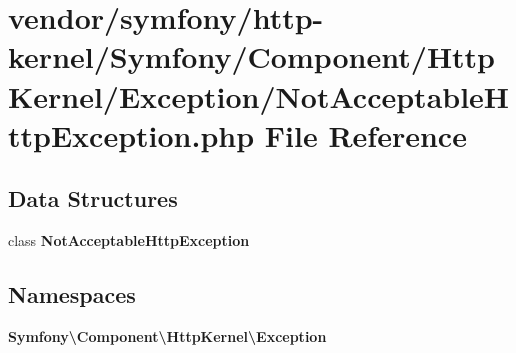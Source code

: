 \section{vendor/symfony/http-\/kernel/\+Symfony/\+Component/\+Http\+Kernel/\+Exception/\+Not\+Acceptable\+Http\+Exception.php File Reference}
\label{_not_acceptable_http_exception_8php}
\subsection*{Data Structures}
\begin{DoxyCompactItemize}
\item 
class {\bf Not\+Acceptable\+Http\+Exception}
\end{DoxyCompactItemize}
\subsection*{Namespaces}
\begin{DoxyCompactItemize}
\item 
 {\bf Symfony\textbackslash{}\+Component\textbackslash{}\+Http\+Kernel\textbackslash{}\+Exception}
\end{DoxyCompactItemize}
